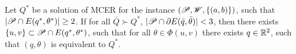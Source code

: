 




\begin{lem}\label{lema:3pnts}
	Let $Q^*$ be a solution of MCER for the instance $(\mathscr{P}, \mathscr{W}, \{(a, b)\})$, such that $|\mathscr{P} \cap E(q^*, \theta^*)|\ge2$.
	If for all $\bar{Q} \succ Q^*$, $|\mathscr{P} \cap \partial E(\bar{q}, \bar{\theta})| < 3$, then there exists $\{u, v\} \subset \mathscr{P} \cap E(q^*, \theta^*)$, such that for all $\theta\in \Phi(u,v)$ there exists $q \in \mathbb{R}^2$, such that $(q, \theta)$ is equivalent to $Q^*$.
\end{lem}

